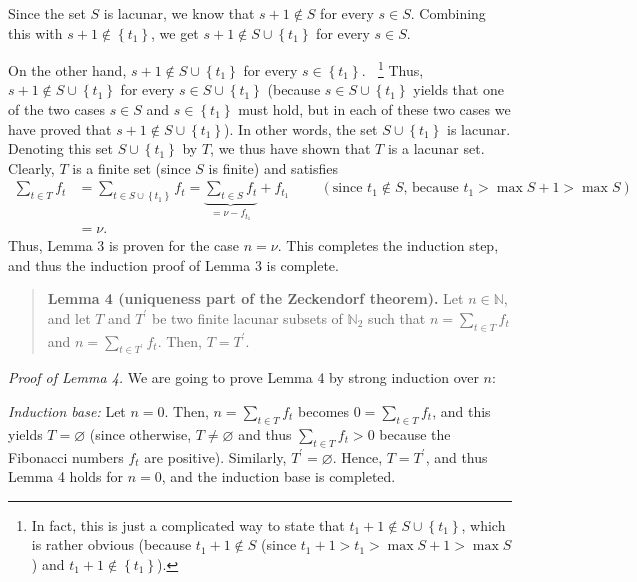 \documentclass[12pt,final,notitlepage,onecolumn]{article}%
\begin{document}
Since the set $S$ is lacunar, we know that $s+1\notin S$ for every $s\in S$.
Combining this with $s+1\notin\left\{  t_{1}\right\}  $, we get $s+1\notin
S\cup\left\{  t_{1}\right\}  $ for every $s\in S$.

On the other hand, $s+1\notin S\cup\left\{  t_{1}\right\}  $ for every
$s\in\left\{  t_{1}\right\}  $.$\ \ \ \ $\footnote{In fact, this is just a
complicated way to state that $t_{1}+1\notin S\cup\left\{  t_{1}\right\}  $,
which is rather obvious (because $t_{1}+1\notin S$ (since $t_{1}+1>t_{1}>\max
S+1>\max S$) and $t_{1}+1\notin\left\{  t_{1}\right\}  $).} Thus, $s+1\notin
S\cup\left\{  t_{1}\right\}  $ for every $s\in S\cup\left\{  t_{1}\right\}  $
(because $s\in S\cup\left\{  t_{1}\right\}  $ yields that one of the two cases
$s\in S$ and $s\in\left\{  t_{1}\right\}  $ must hold, but in each of these
two cases we have proved that $s+1\notin S\cup\left\{  t_{1}\right\}  $). In
other words, the set $S\cup\left\{  t_{1}\right\}  $ is lacunar. Denoting this
set $S\cup\left\{  t_{1}\right\}  $ by $T$, we thus have shown that $T$ is a
lacunar set. Clearly, $T$ is a finite set (since $S$ is finite) and satisfies%
\begin{align*}
\sum\limits_{t\in T}f_{t}  &  =\sum\limits_{t\in S\cup\left\{  t_{1}\right\}
}f_{t}=\underbrace{\sum\limits_{t\in S}f_{t}}_{=\nu-f_{t_{1}}}+f_{t_{1}%
}\ \ \ \ \ \ \ \ \ \ \left(  \text{since }t_{1}\notin S\text{, because }%
t_{1}>\max S+1>\max S\right) \\
&  =\nu.
\end{align*}
Thus, Lemma 3 is proven for the case $n=\nu$. This completes the induction
step, and thus the induction proof of Lemma 3 is complete.

\begin{quote}
\textbf{Lemma 4 (uniqueness part of the Zeckendorf theorem).} Let
$n\in\mathbb{N}$, and let $T$ and $T^{\prime}$ be two finite lacunar subsets of
$\mathbb{N}_{2}$ such that $n=\sum\limits_{t\in T}f_{t}$ and $n=\sum
\limits_{t\in T^{\prime}}f_{t}$. Then, $T=T^{\prime}$.
\end{quote}

\textit{Proof of Lemma 4.} We are going to prove Lemma 4 by strong induction
over $n$:

\textit{Induction base:} Let $n=0$. Then, $n=\sum\limits_{t\in T}f_{t}$
becomes $0=\sum\limits_{t\in T}f_{t}$, and this yields $T=\varnothing$ (since
otherwise, $T\neq\varnothing$ and thus $\sum\limits_{t\in T}f_{t}>0$ because
the Fibonacci numbers $f_{t}$ are positive). Similarly, $T^{\prime
}=\varnothing$. Hence, $T=T^{\prime}$, and thus Lemma 4 holds for $n=0$, and
the induction base is completed.
\end{document}

